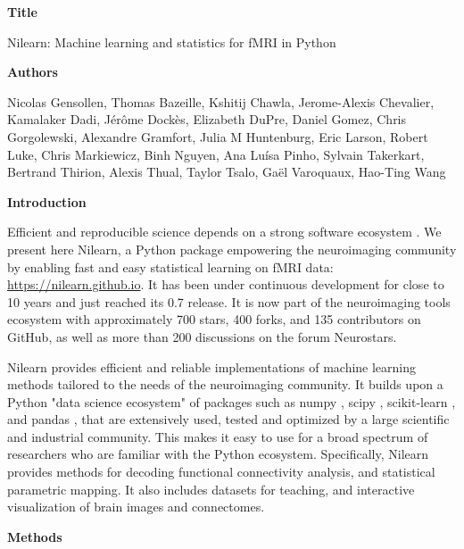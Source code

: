 \documentclass[a4paper]{article}
\begin{document}
\noindent \textbf{Title}

\medskip

\noindent Nilearn: Machine learning and statistics for fMRI in Python

\bigskip

\noindent \textbf{Authors}

\medskip

\noindent Nicolas Gensollen,  Thomas Bazeille, Kshitij Chawla, Jerome-Alexis Chevalier, Kamalaker Dadi, Jérôme Dockès, Elizabeth DuPre, Daniel Gomez, Chris Gorgolewski, Alexandre Gramfort, Julia M Huntenburg, Eric Larson, Robert Luke, Chris Markiewicz, Binh Nguyen, Ana Luísa Pinho, Sylvain Takerkart, Bertrand Thirion, Alexis Thual, Taylor Tsalo, Gaël Varoquaux, Hao-Ting Wang

\bigskip

\noindent \textbf{Introduction}

\medskip

\noindent Efficient and reproducible science depends on a strong software ecosystem \cite{Poldrack2019}. We present here Nilearn, a Python package empowering the neuroimaging community by enabling fast and easy statistical learning on fMRI data: \url{https://nilearn.github.io}. It has been under continuous development for close to 10 years and just reached its 0.7 release. It is now part of the neuroimaging tools ecosystem with approximately 700 stars, 400 forks, and 135 contributors on GitHub, as well as more than 200 discussions on the forum Neurostars.

\medskip

\noindent Nilearn provides efficient and reliable implementations of machine learning methods tailored to the needs of the neuroimaging community. It builds upon a Python "data science ecosystem" of packages such as numpy \cite{VanDerWalt2011}, scipy \cite{Oliphant2007}, scikit-learn \cite{Pedregosa2011}, and pandas \cite{McKinney2010}, that are extensively used, tested and optimized by a large scientific and industrial community. This makes it easy to use for a broad spectrum of researchers who are familiar with the Python ecosystem. Specifically, Nilearn provides methods  for decoding functional connectivity analysis, and statistical parametric mapping. It also includes datasets for teaching, and interactive visualization of brain images and connectomes.

\bigskip

\noindent \textbf{Methods}

\medskip
\end{document}
